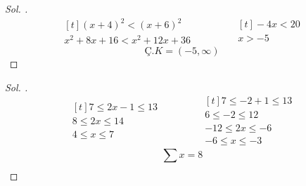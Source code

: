 \documentclass{article}
\theoremstyle{mytheoremstyle}
\theoremstyle{mytheoremstyle}
\theoremstyle{myproblemstyle}
\begin{document}
\begin{problem}[$ |x + 4| < |x + 6| $, $ Ç.K = ? $]
\end{problem}

\begin{proof}[\textit{ Sol. }]
  \begin{equation*}
    \begin{aligned}[t]
      (x + 4)^2 < (x + 6)^2\\
      x^2 + 8x + 16 < x^2 + 12x + 36
    \end{aligned}
    \qquad\qquad
    \begin{aligned}[t]
      -4x < 20\\
      x > -5
    \end{aligned}
  \end{equation*}
  $$ Ç.K = (-5, \infty) $$
\end{proof}

\begin{problem}
\end{problem}

\begin{proof}[\textit{ Sol. }]
  \begin{equation*}
    \begin{aligned}[t]
      7 \le 2x - 1 \le 13\\
      8 \le 2x \le 14\\
      4 \le x \le 7
    \end{aligned}
    \qquad\qquad
    \begin{aligned}[t]
      7 \le -2 + 1 \le 13\\
      6 \le -2 \le 12\\
      -12 \le 2x \le -6\\
      -6 \le x \le -3
    \end{aligned}
  \end{equation*}
  $$ \sum_{}^{}x = 8 $$
\end{proof}
\end{document}
